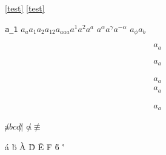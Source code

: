 \documentclass{ctexbook}
\begin{document}
\label{test}
\ref{test}
\eqref{test}

\verb|a_1|
\(a_a a_1 a_2 a_{12} a_{aaa} a^1 a^2 a^a \)
\(a^\alpha a^\gamma a^{-\alpha}\)
\(a_\phi a_b\)

\begin{equation}\label{equ:1}
  a_a
\end{equation}

\begin{align}
  a_a
\end{align}

\begin{equation}
  \begin{aligned}
    a_a
  \end{aligned}
\end{equation}
\begin{gather}
  a_a
\end{gather}

\begin{align*}
  a_a
\end{align*}

\( \not abcd \not |\)
\(\not \alpha \not\equiv \)

\'a \"b \`A \^D \~E \.F \`6 \'\alpha \.\beta \not \pi
\end{document}
